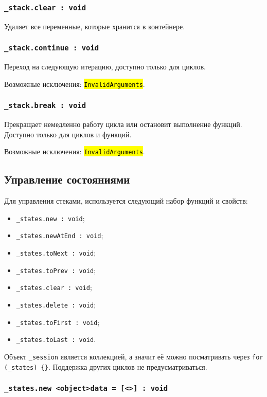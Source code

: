 \documentclass[a4paper, 14pt]{extarticle}
\newcommand{\ferror}[1]{{\fontsize{11pt}{12pt}\tt{\sethlcolor{yellow}\hl{#1}}}}
\newenvironment{icItems}
	{ \begin{itemize} [noitemsep,nolistsep] }
	{ \end{itemize} }
\begin{document}
\subsubsection{\lstinline|_stack.clear : void|}

Удаляет все переменные, которые хранится в контейнере.

\subsubsection{\lstinline|_stack.continue : void|}

Переход на следующую итерацию, доступно только для циклов.

Возможные исключения: \ferror{InvalidArguments}.

\subsubsection{\lstinline|_stack.break : void|}

Прекращает немедленно работу цикла или остановит выполнение функций. Доступно только для циклов и функций.

Возможные исключения: \ferror{InvalidArguments}.

\subsection{Управление состояниями}

Для управления стеками, используется следующий набор функций и свойств:
\begin{icItems}
	\item \lstinline|_states.new : void|;
	\item \lstinline|_states.newAtEnd : void|;
	\item \lstinline|_states.toNext : void|;
	\item \lstinline|_states.toPrev : void|;
	\item \lstinline|_states.clear : void|;
	\item \lstinline|_states.delete : void|;
	\item \lstinline|_states.toFirst : void|;
	\item \lstinline|_states.toLast : void|.
\end{icItems}

Объект \lstinline|_session| является коллекцией, а значит её можно посматривать через \lstinline|for (_states) {}|. Поддержка других циклов не предусматриваться.

\subsubsection{\lstinline|_states.new <object>data = [<>] : void|}
\end{document}
